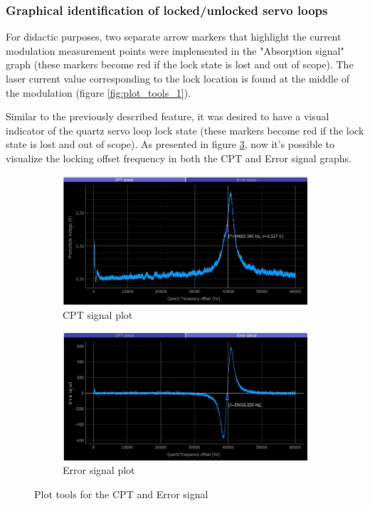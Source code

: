 \documentclass[a4paper,12pt]{article}
\begin{document}
\newpage    
\subsubsection{Graphical identification of locked/unlocked servo loops}
\label{section:lock/unlock}

For didactic purposes, two separate arrow markers that highlight the current modulation measurement points were implemented in the "Absorption signal" graph (these markers become red if the lock state is lost and out of scope). The laser current value corresponding to the lock location is found at the middle of the modulation (figure \ref{fig:plot_tools_1}).

Similar to the previously described feature, it was desired to have a visual indicator of the quartz servo loop lock state (these markers become red if the lock state is lost and out of scope). As presented in figure \ref{fig:plot_tools_2}, now it's possible to visualize the locking offset frequency in both the CPT and Error signal graphs.
\begin{figure}[!h]
\centering
\begin{subfigure}[b]{0.49\textwidth}
\centering
\includegraphics[height=0.52\textwidth]{Images/plot_tools_2.png}
\captionsetup{justification=centering}
\caption{CPT signal plot}
\label{fig:cpt_signal}
\end{subfigure}
\hfill
\begin{subfigure}[b]{0.49\textwidth}
\centering
\includegraphics[height=0.52\textwidth]{Images/plot_tools_3.png}
\captionsetup{justification=centering}
\caption{Error signal plot}
\label{fig:error_signal}
\end{subfigure}
\caption{Plot tools for the CPT and Error signal} 
\label{fig:plot_tools_2}
\end{figure}
    
\end{document}
